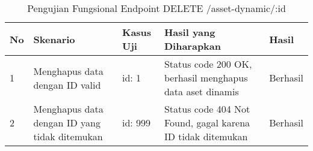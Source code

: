 \begin{table}[H]
    \centering
    \begin{tabular}{|p{0.5cm}|p{3cm}|p{5cm}|p{5cm}|p{1.5cm}|}
        \hline
        \rowcolor[HTML]{DAE8FC} 
        \textbf{No} & \textbf{Skenario} & \textbf{Kasus Uji} & \textbf{Hasil yang Diharapkan} & \textbf{Hasil} \\ \hline
        1 & Menghapus data dengan ID valid & 
        id: 1 & 
        Status code 200 OK, berhasil menghapus data aset dinamis & 
        Berhasil \\ \hline
        2 & Menghapus data dengan ID yang tidak ditemukan & 
        id: 999 & 
        Status code 404 Not Found, gagal karena ID tidak ditemukan & 
        Berhasil \\ \hline
    \end{tabular}
    \caption{Pengujian Fungsional Endpoint DELETE /asset-dynamic/:id}
    \label{tab:asset_dynamic_delete_testing}
\end{table}
